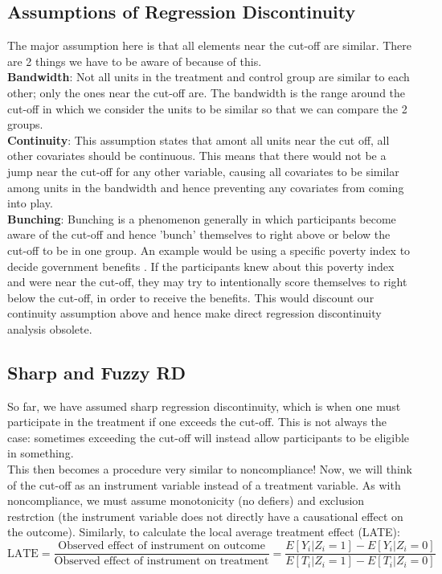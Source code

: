 \documentclass{article}
\begin{document}
\subsection{Assumptions of Regression Discontinuity}
The major assumption here is that all elements near the cut-off are similar.
There are 2 things we have to be aware of because of this.
\\
\textbf{Bandwidth}: Not all units in the treatment and control group are similar to each other; only the ones near the cut-off are. 
The bandwidth is the range around the cut-off in which we consider the units to be similar so that we can compare the 2 groups.
\\
\textbf{Continuity}: This assumption states that amont all units near the cut off, all other covariates should be continuous.
This means that there would not be a jump near the cut-off for any other variable, causing all covariates to be similar among units in the bandwidth and hence preventing any covariates from coming into play. 
\\
\textbf{Bunching}: Bunching is a phenomenon generally in which participants become aware of the cut-off and hence 'bunch' themselves to right above or below the cut-off to be in one group.
An example would be using a specific poverty index to decide government benefits .
If the participants knew about this poverty index and were near the cut-off, they may try to intentionally score themselves to right below the cut-off, in order to receive the benefits.
This would discount our continuity assumption above and hence make direct regression discontinuity analysis obsolete.

\subsection{Sharp and Fuzzy RD}
So far, we have assumed sharp regression discontinuity, which is when one must participate in the treatment if one exceeds the cut-off.
This is not always the case: sometimes exceeding the cut-off will instead allow participants to be eligible in something. 
\\
This then becomes a procedure very similar to noncompliance!
Now, we will think of the cut-off as an instrument variable instead of a treatment variable.
As with noncompliance, we must assume monotonicity (no defiers) and exclusion restrction (the instrument variable does not directly have a causational effect on the outcome).
Similarly, to calculate the local average treatment effect (LATE):
$$\textrm{LATE} = \frac{\textrm{Observed effect of instrument on outcome}}{\textrm{Observed effect of instrument on treatment}} = \frac{E[Y_i|Z_i=1]-E[Y_i|Z_i=0]}{E[T_i|Z_i=1]-E[T_i|Z_i=0]}$$
\end{document}
